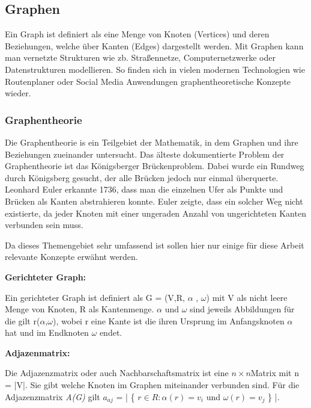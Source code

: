 \subsection{Graphen}

Ein Graph ist definiert als eine Menge von Knoten (Vertices) und deren Beziehungen, welche über Kanten (Edges) dargestellt werden. Mit Graphen kann man vernetzte Strukturen wie zb. Straßennetze, Computernetzwerke oder Datenstrukturen modellieren. So finden sich in vielen modernen Technologien wie Routenplaner oder Social Media Anwendungen graphentheoretische Konzepte wieder.
	\subsubsection{Graphentheorie}
	Die Graphentheorie is ein Teilgebiet der Mathematik, in dem Graphen und ihre Beziehungen zueinander untersucht. Das älteste dokumentierte Problem der Graphentheorie ist das Königsberger Brückenproblem. Dabei wurde ein Rundweg durch Königsberg gesucht, der alle Brücken jedoch nur einmal überquerte. Leonhard Euler erkannte 1736, dass man die einzelnen Ufer als Punkte und Brücken als Kanten abstrahieren konnte. Euler zeigte, dass ein solcher Weg nicht existierte, da jeder Knoten mit einer ungeraden Anzahl von ungerichteten Kanten verbunden sein muss.
	\newline
	
	Da dieses Themengebiet sehr umfassend ist sollen hier nur einige für diese Arbeit relevante Konzepte erwähnt werden.\newline
	
	\textbf{Gerichteter Graph: }
	
	Ein gerichteter Graph ist definiert als G = (V,R, $\alpha$ , $\omega$) mit V als nicht leere Menge von Knoten, R als Kantenmenge.  $\alpha$ und $\omega$ sind jeweils Abbildungen für die gilt r($\alpha$,$\omega$), wobei r eine Kante ist die ihren Ursprung im Anfangsknoten $\alpha$ hat und im Endknoten $\omega$ endet. \cite[7]{Krumke2012}
	\newline
	
	\textbf{Adjazenmatrix:}
	
	Die Adjazenzmatrix oder auch Nachbarschaftsmatrix ist eine  $n\times n $Matrix mit n = |V|. Sie gibt welche Knoten im Graphen miteinander verbunden sind. Für die Adjazenzmatrix \textit{A(G)} gilt $a_{aj}$ = | \{ $r \in R: \alpha(r) = v_{i}$ und $\omega(r) = v_{j} $ \} |. \cite[17ff]{Krumke2012}\newline	

